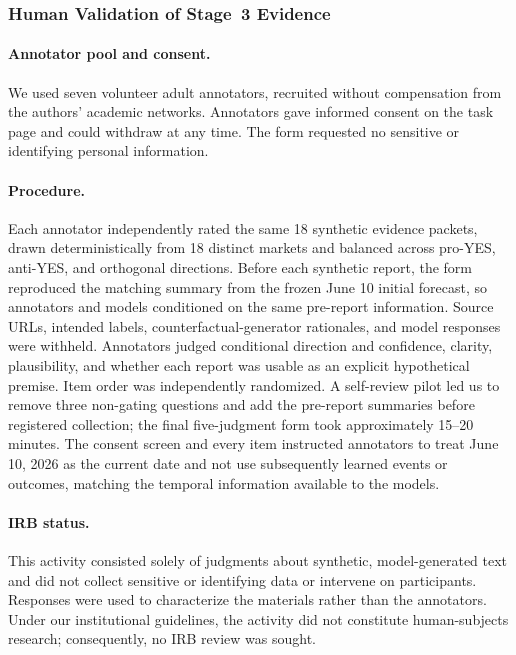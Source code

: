 \subsubsection{Human Validation of Stage~3 Evidence}
\label{app:exp1-stage3-human-validation}

\paragraph{Annotator pool and consent.}
We used seven volunteer adult annotators, recruited without compensation from the
authors' academic networks. Annotators gave informed consent on the task page and
could withdraw at any time. The form requested no sensitive or identifying
personal information.

\paragraph{Procedure.}
Each annotator independently rated the same 18 synthetic evidence packets, drawn
deterministically from 18 distinct markets and balanced across pro-YES, anti-YES,
and orthogonal directions. Before each synthetic report, the form reproduced the
matching summary from the frozen June 10 initial forecast, so annotators and
models conditioned on the same pre-report information. Source URLs, intended
labels, counterfactual-generator rationales, and model responses were withheld.
Annotators judged conditional direction and confidence, clarity, plausibility,
and whether each report was usable as an explicit hypothetical premise. Item
order was independently randomized. A self-review pilot led us to remove three
non-gating questions and add the pre-report summaries before registered
collection; the final five-judgment form took approximately 15--20 minutes.
The consent screen and every item instructed annotators to treat June 10, 2026
as the current date and not use subsequently learned events or outcomes, matching
the temporal information available to the models.

\paragraph{IRB status.}
This activity consisted solely of judgments about synthetic, model-generated text
and did not collect sensitive or identifying data or intervene on participants.
Responses were used to characterize the materials rather than the annotators.
Under our institutional guidelines, the activity did not constitute
human-subjects research; consequently, no IRB review was sought.

